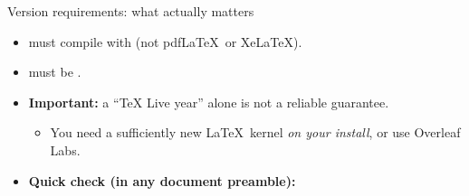 \begin{frame}{Version requirements: what actually matters}
\begin{itemize}
\item {} must compile with  (not pdf\LaTeX\ or Xe\LaTeX).

\bigskip

\item {} must be .
\item \textbf{Important:} a “TeX Live year” alone is not a reliable guarantee.
  \begin{itemize}
  \item You need a sufficiently new \LaTeX\ kernel \emph{on your install}, or use Overleaf Labs.
  \end{itemize}

\bigskip

\item \textbf{Quick check (in any document preamble):}

  \medskip  
{}
\end{itemize}
\end{frame}

